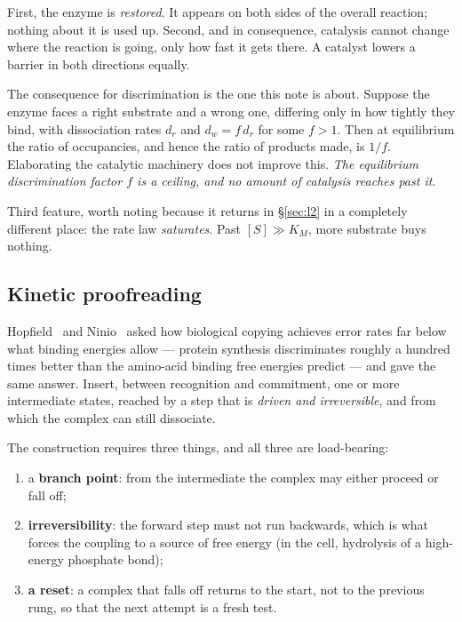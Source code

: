 \documentclass[11pt]{article}
\theoremstyle{plain}
\theoremstyle{definition}
\theoremstyle{remark}
\begin{document}
First, the enzyme is \emph{restored}. It appears on both sides of the overall
reaction; nothing about it is used up. Second, and in consequence, catalysis
cannot change where the reaction is going, only how fast it gets there. A
catalyst lowers a barrier in both directions equally.

The consequence for discrimination is the one this note is about. Suppose the
enzyme faces a right substrate and a wrong one, differing only in how tightly
they bind, with dissociation rates $d_r$ and $d_w = f\,d_r$ for some
$f > 1$. Then at equilibrium the ratio of occupancies, and hence the ratio of
products made, is $1/f$. Elaborating the catalytic machinery does not improve
this. \emph{The equilibrium discrimination factor $f$ is a ceiling, and no
amount of catalysis reaches past it.}

Third feature, worth noting because it returns in \S\ref{sec:l2} in a
completely different place: the rate law \emph{saturates}. Past $[S] \gg K_M$,
more substrate buys nothing.

\subsection{Kinetic proofreading}

Hopfield~\cite{Hopfield1974} and Ninio~\cite{Ninio1975} asked how biological
copying achieves error rates far below what binding energies allow --- protein
synthesis discriminates roughly a hundred times better than the amino-acid
binding free energies predict --- and gave the same answer. Insert, between
recognition and commitment, one or more intermediate states, reached by a step
that is \emph{driven and irreversible}, and from which the complex can still
dissociate.

The construction requires three things, and all three are load-bearing:

\begin{enumerate}[leftmargin=*,label=(\alph*)]
\item a \textbf{branch point}: from the intermediate the complex may either
  proceed or fall off;
\item \textbf{irreversibility}: the forward step must not run backwards, which
  is what forces the coupling to a source of free energy (in the cell,
  hydrolysis of a high-energy phosphate bond);
\item \textbf{a reset}: a complex that falls off returns to the start, not to
  the previous rung, so that the next attempt is a fresh test.
\end{enumerate}
\end{document}

